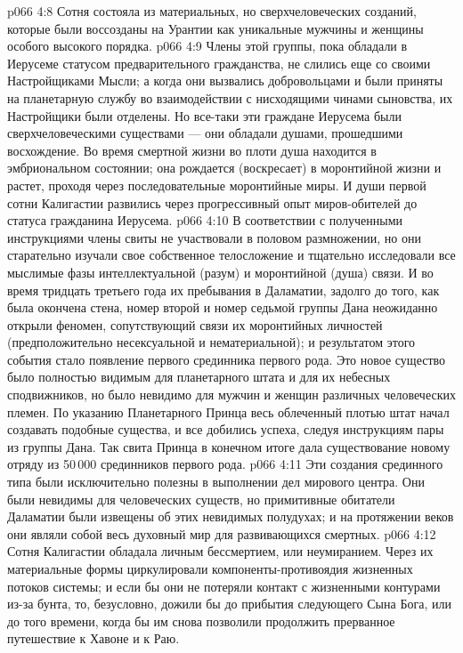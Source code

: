 \vs p066 4:8 \pc {}\bibnobreakspace Сотня состояла из материальных, но сверхчеловеческих созданий, которые были воссозданы на Урантии как уникальные мужчины и женщины особого высокого порядка.
\vs p066 4:9 Члены этой группы, пока обладали в Иерусеме статусом предварительного гражданства, не слились еще со своими Настройщиками Мысли; а когда они вызвались добровольцами и были приняты на планетарную службу во взаимодействии с нисходящими чинами сыновства, их Настройщики были отделены. Но все\hyp{}таки эти граждане Иерусема были сверхчеловеческими существами --- они обладали душами, прошедшими восхождение. Во время смертной жизни во плоти душа находится в эмбриональном состоянии; она рождается (воскресает) в моронтийной жизни и растет, проходя через последовательные моронтийные миры. И души первой сотни Калигастии развились через прогрессивный опыт миров\hyp{}обителей до статуса гражданина Иерусема.
\vs p066 4:10 В соответствии с полученными инструкциями члены свиты не участвовали в половом размножении, но они старательно изучали свое собственное телосложение и тщательно исследовали все мыслимые фазы интеллектуальной (разум) и моронтийной (душа) связи. И во время тридцать третьего года их пребывания в Даламатии, задолго до того, как была окончена стена, номер второй и номер седьмой группы Дана неожиданно открыли феномен, сопутствующий связи их моронтийных личностей (предположительно несексуальной и нематериальной); и результатом этого события стало появление первого срединника первого рода. Это новое существо было полностью видимым для планетарного штата и для их небесных сподвижников, но было невидимо для мужчин и женщин различных человеческих племен. По указанию Планетарного Принца весь облеченный плотью штат начал создавать подобные существа, и все добились успеха, следуя инструкциям пары из группы Дана. Так свита Принца в конечном итоге дала существование новому отряду из 50\,000 срединников первого рода.
\vs p066 4:11 Эти создания срединного типа были исключительно полезны в выполнении дел мирового центра. Они были невидимы для человеческих существ, но примитивные обитатели Даламатии были извещены об этих невидимых полудухах; и на протяжении веков они являли собой весь духовный мир для развивающихся смертных.
\vs p066 4:12 \pc {}\bibnobreakspace Сотня Калигастии обладала личным бессмертием, или неумиранием. Через их материальные формы циркулировали компоненты\hyp{}противоядия жизненных потоков системы; и если бы они не потеряли контакт с жизненными контурами из\hyp{}за бунта, то, безусловно, дожили бы до прибытия следующего Сына Бога, или до того времени, когда бы им снова позволили продолжить прерванное путешествие к Хавоне и к Раю.
